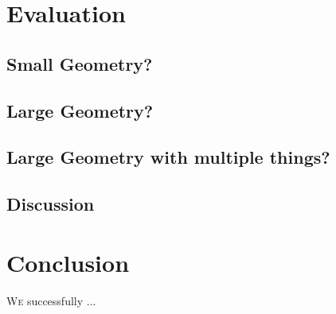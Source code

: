 \documentclass[%
    ]{\PathToTumTemplate/thesis/tum_thesis}
\begin{document}
\chapter{Evaluation} \label{chap:evaluation}



\section{Small Geometry?}\label{sec:small_geometry}



\section{Large Geometry?}\label{sec:large_geometry}



\section{Large Geometry with multiple things?}\label{sec:large_geometry_w_thigns}



\section{Discussion}\label{sec:eval_discussion}



\chapter{Conclusion} \label{chap:conclusion}

 
\lettrine{W}{e} successfully ...
\end{document}
